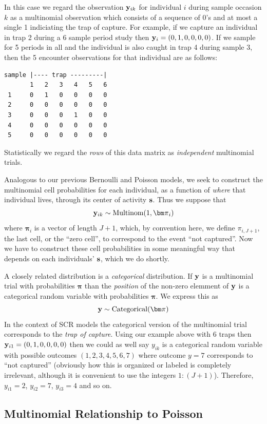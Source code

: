 {In this case we regard the observation ${\bf y}_{ik}$ for
individual $i$ during sample occasion $k$ as a multinomial observation
which consists of a sequence of 0's and at most a single 1 indiciating
the trap of capture. For example, if we capture an individual in trap
2 during a 6 sample period study then ${\bf y}_{i} = (0,1,0,0,0,0)$.
If we sample for 5 periods in all and the individual is also caught
in trap 4 during sample 3, then the 5 encounter observations for that
individual are as follows:
\begin{verbatim}
sample |---- trap ---------|
       1   2   3   4   5   6
 1     0   1   0   0   0   0
 2     0   0   0   0   0   0
 3     0   0   0   1   0   0
 4     0   0   0   0   0   0
 5     0   0   0   0   0   0
\end{verbatim}
Statistically we regard the {\it rows} of this data matrix as {\it
  independent} multinomial trials.

Analogous to our previous Bernoulli and Poisson models, we seek to
construct the multinomial cell probabilities for each individual, as a
function of {\it where} that individual lives, through its center of
activity ${\bf s}$. Thus we suppose that
\[
 {\bf y}_{ik} \sim \mbox{Multinom}(1, {\bm \pi}_{i} )
\]
where ${\bm \pi}_{i}$ is a vector of length $J+1$, which, by
convention here, we define $\pi_{i,J+1}$, the last cell, or the ``zero
cell'', to correspond to the event ``not captured''.  Now we have to
construct these cell probabilities in some meaningful way that depends
on each individuals' ${\bf s}$, which we do shortly.

A closely related distribution is a {\it categorical} distribution.
If ${\bf y}$ is a multinomial trial with probabilities
${\bm \pi}$ than the {\it position} of the non-zero
elemment of ${\bf y}$ is a categorical random variable with probabilities
${\bm \pi}$.
We express this as
\[
{\bf y} \sim \mbox{Categorical}( {\bm \pi} )
\]
 In the context of SCR models the categorical version of
the 
multinomial trial corresponds to the {\it trap of capture}.
Using our example above with 6 traps then ${\bf y}_{i1} =
(0,1,0,0,0,0)$ then we could as well say $y_{ik}$ is a categorical
random variable with possible outcomes $(1,2,3,4,5,6,7)$ where outcome
$y=7$ corresponds to ``not captured'' (obviously how this is organized
or labeled is completely irrelevant, although it is convenient to use
the integers $1:(J+1)$).
Therefore, $y_{i1} = 2$, $y_{i2} = 7$, $y_{i3} = 4$ and so on.


\subsection{Multinomial Relationship to Poisson}

}
